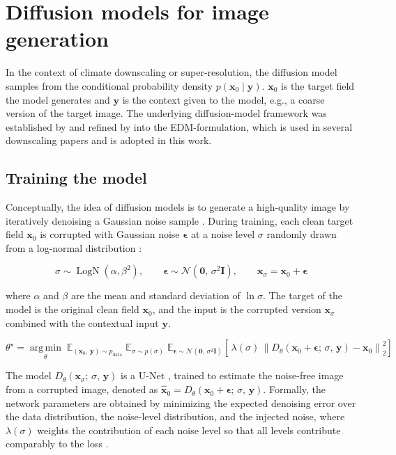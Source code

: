 \documentclass[
]{krantz}
\begin{document}
\section{Diffusion models for image generation}\label{ddm-theory}

In the context of climate downscaling or super-resolution, the diffusion model samples from the conditional probability density \(p(\boldsymbol{x}_0 \mid \boldsymbol{y})\). \(\boldsymbol{x}_0\) is the target field the model generates and \(\boldsymbol{y}\) is the context given to the model,
e.g., a coarse version of the target image. The underlying diffusion-model framework was established by \citet{song2021} and refined by \citet{karras2022} into the EDM-formulation, which is used in several downscaling papers
\citep{watt2024, mardani2025, lopezgomez2025} and is adopted in this work.

\subsection{Training the model}\label{training-the-model}

Conceptually, the idea of diffusion models is to generate a high-quality image by iteratively denoising a Gaussian noise sample \citep{song2021}. During training, each clean target field \(\boldsymbol{x}_0\) is corrupted with Gaussian noise \(\boldsymbol{\epsilon}\)
at a noise level \(\sigma\) randomly drawn from a log-normal distribution \citep{karras2022}:

\[
\sigma \sim \operatorname{LogN}(\alpha, \beta^2), \qquad
\boldsymbol{\epsilon} \sim \mathcal{N}(\boldsymbol{0},\, \sigma^2 \mathbf{I}), \qquad
\boldsymbol{x}_\sigma = \boldsymbol{x}_0 + \boldsymbol{\epsilon}
\]

where \(\alpha\) and \(\beta\) are the mean and standard deviation of \(\ln \sigma\).
The target of the model is the original clean field \(\boldsymbol{x}_0\), and the input is the corrupted version \(\boldsymbol{x}_\sigma\) combined with the contextual input \(\boldsymbol{y}\).

\[
\theta^\star = \operatorname*{arg\,min}_{\theta}\;
\mathbb{E}_{(\boldsymbol{x}_0,\, \boldsymbol{y}) \sim p_{\text{data}}}\;
\mathbb{E}_{\sigma \sim p(\sigma)}\;
\mathbb{E}_{\boldsymbol{\epsilon} \sim \mathcal{N}(\boldsymbol{0},\, \sigma^2 \mathbf{I})}
\left[\, \lambda(\sigma)\, \left\lVert D_\theta(\boldsymbol{x}_0 + \boldsymbol{\epsilon};\, \sigma,\, \boldsymbol{y}) - \boldsymbol{x}_0 \right\rVert_2^2 \right]
\]

The model \(D_\theta(\boldsymbol{x}_\sigma;\, \sigma,\, \boldsymbol{y})\) is a U-Net \citep{ronneberger2015}, trained to estimate the noise-free image from a corrupted image, denoted as
\(\hat{\boldsymbol{x}}_0 = D_\theta(\boldsymbol{x}_0 + \boldsymbol{\epsilon};\, \sigma,\, \boldsymbol{y})\). Formally, the network parameters are obtained by minimizing the expected denoising error over the data distribution,
the noise-level distribution, and the injected noise, where \(\lambda(\sigma)\) weights the contribution of each noise level so that all levels contribute comparably to the loss \citep{karras2022}.
\end{document}
